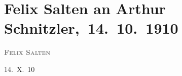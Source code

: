 

\renewcommand{\erwaehntePersonen}{Personen: Alfred von Berger, Hedwig Bleibtreu, Felix Salten, Ottilie Salten, Adele Sandrock, Olga Schnitzler}
\renewcommand{\erwaehnteInstitutionen}{Institutionen: Burgtheater}
\renewcommand{\erwaehnteOrte}{Orte: Semmering, Wien}
\renewcommand{\erwaehnteWerke}{}
\section[ Felix Salten an Arthur Schnitzler, 14. 10. 1910]{Felix Salten an Arthur Schnitzler, 14. 10. 1910}
\nopagebreak{}
\rehead{ }\normalsize\beginnumbering{}
\toendnotes[C]{\smallbreak\pagebreak[2]}
\toendnotes[C]{\smallbreak}
\pstart
           \noindent{}{\pb}\textcolor{gray}{\textbf{\textsc{Felix Salten}}}\pend
           
\pstart
           \raggedleft{}14. X. 10\pend
           
